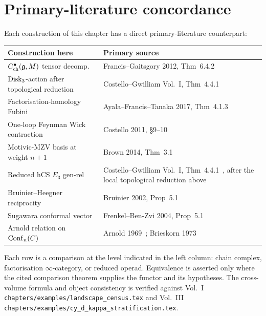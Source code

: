 \section{Primary-literature concordance}
\label{sec:ch-ce-primary-lit-concordance}

\begin{remark}
\label{rem:ch-ce-side-by-side}
%
Each construction of this chapter has a direct primary-literature
counterpart:
\begin{center}
\begin{tabular}{ll}
\toprule
Construction here & Primary source \\
\midrule
$C^\bullet_{\mathrm{ch}}(\mathfrak{g},M)$ tensor decomp.
& Francis--Gaitsgory 2012, Thm~6.4.2~\cite{FG12}\\
$\mathrm{Disk}_3$-action after topological reduction
& Costello--Gwilliam Vol.~I, Thm~4.4.1~\cite{CG17}\\
Factorisation-homology Fubini
& Ayala--Francis--Tanaka 2017, Thm~4.1.3~\cite{AyalaFrancisTanaka2017}\\
One-loop Feynman Wick contraction
& Costello 2011, \S9--10~\cite{CostelloRenormalization}\\
Motivic-MZV basis at weight $n+1$
& Brown 2014, Thm~3.1~\cite{Brown2014}\\
Reduced hCS $E_3$ gen-rel
& Costello--Gwilliam Vol.~I, Thm~4.4.1~\cite{CG17}, after the local
topological reduction above\\
Bruinier--Heegner reciprocity
& Bruinier 2002, Prop~5.1~\cite{Bruinier2002}\\
Sugawara conformal vector
& Frenkel--Ben-Zvi 2004, Prop~5.1~\cite{FrenkelBenZvi2004}\\
Arnold relation on $\mathrm{Conf}_n(C)$
& Arnold 1969~\cite{Arnold1969}; Brieskorn 1973\\
\bottomrule
\end{tabular}
\end{center}
Each row is a comparison at the level indicated in the left column:
chain complex, factorisation $\infty$-category, or reduced operad.
Equivalence is asserted only where the cited comparison theorem supplies
the functor and its hypotheses. The cross-volume formula and object
consistency is verified against Vol.~I
\texttt{chapters/examples/landscape\_census.tex} and Vol.~III
\texttt{chapters/examples/cy\_d\_kappa\_stratification.tex}.
\end{remark}

